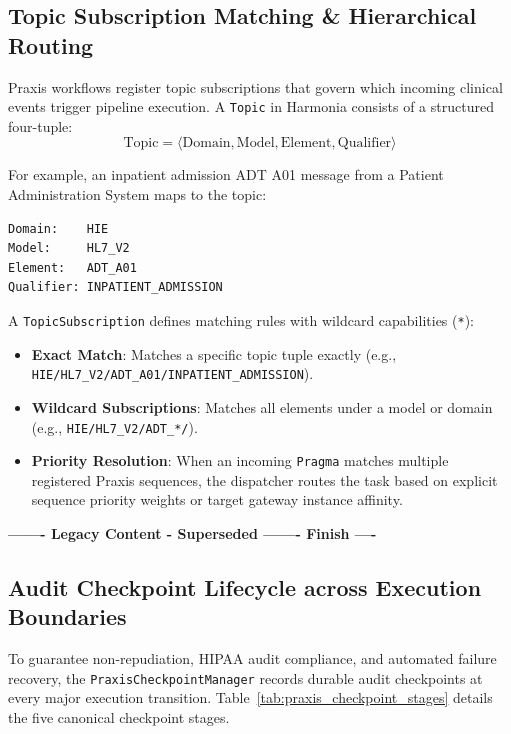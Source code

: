 \subsection{Topic Subscription Matching \& Hierarchical Routing}
\label{subsec:praxis_topic_subscriptions}

Praxis workflows register topic subscriptions that govern which incoming clinical events trigger pipeline execution. A \texttt{Topic} in Harmonia consists of a structured four-tuple:
\begin{equation}
\text{Topic} = \langle \text{Domain}, \text{Model}, \text{Element}, \text{Qualifier} \rangle
\end{equation}

For example, an inpatient admission ADT A01 message from a Patient Administration System maps to the topic:
\begin{lstlisting}[caption={Hierarchical Topic Representation}]
Domain:    HIE
Model:     HL7_V2
Element:   ADT_A01
Qualifier: INPATIENT_ADMISSION
\end{lstlisting}

A \texttt{TopicSubscription} defines matching rules with wildcard capabilities (\texttt{*}):
\begin{itemize}
    \item \textbf{Exact Match}: Matches a specific topic tuple exactly (e.g., \texttt{HIE/HL7\_V2/ADT\_A01/INPATIENT\_ADMISSION}).
    \item \textbf{Wildcard Subscriptions}: Matches all elements under a model or domain (e.g., \texttt{HIE/HL7\_V2/ADT\_*/\allowbreak *}).
    \item \textbf{Priority Resolution}: When an incoming \texttt{Pragma} matches multiple registered Praxis sequences, the dispatcher routes the task based on explicit sequence priority weights or target gateway instance affinity.
\end{itemize}


\par\noindent\textbf{------- Legacy Content - Superseded ------- Finish ----}

\subsection{Audit Checkpoint Lifecycle across Execution Boundaries}
\label{subsec:praxis_checkpoint_lifecycle}

To guarantee non-repudiation, HIPAA audit compliance, and automated failure recovery, the \texttt{PraxisCheckpointManager} records durable audit checkpoints at every major execution transition. Table~\ref{tab:praxis_checkpoint_stages} details the five canonical checkpoint stages.

